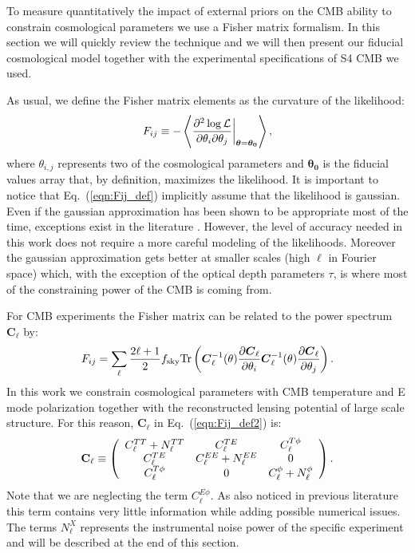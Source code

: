 \documentclass[aps,prd,reprint,superscriptaddress]{revtex4-1}
\newcommand\refeq[1]{Eq.~(\ref{eqn:#1})}
\begin{document}
To measure quantitatively the impact of external priors on the CMB ability to constrain cosmological parameters we use a Fisher matrix formalism. In this section we will quickly review  the technique and we will then present our fiducial cosmological model together with the experimental specifications of S4 CMB we used.

As usual, we define the Fisher matrix elements as the curvature of the likelihood:
\begin{equation}
	\centering
		F_{ij} \equiv - \left\langle\frac{\partial^2 \log \mathcal{L}}{\partial \theta_i \partial \theta_j} \bigg|_{\boldsymbol{\theta} = \boldsymbol{\theta_0}}\right\rangle,
	\label{eqn:Fij_def}
\end{equation}
where $\theta_{i,j}$ represents two of the cosmological parameters and $\boldsymbol{\theta_0}$ is the fiducial values array that, by definition, maximizes the likelihood. It is important to notice that \refeq{Fij_def} implicitly assume that the likelihood is gaussian. Even if the gaussian approximation has been shown to be appropriate most of the time, exceptions exist in the literature \cite{2012JCAP...09..009W}. However, the level of accuracy needed in this work does not require a more careful modeling of the likelihoods. Moreover the gaussian approximation gets better at smaller scales (high $\ell$ in Fourier space) which, with the exception of the optical depth parameters $\tau$, is where most of the constraining power of the CMB is coming from.

For CMB experiments the Fisher matrix can be related to the power spectrum $\boldsymbol{C}_\ell$ by:
\begin{equation}
 F_{ij} = \sum_\ell \frac{2\ell+1}{2} f_{\rm sky} {\rm Tr} \left(  \boldsymbol{C}^{-1}_\ell( \theta) \frac{\partial \boldsymbol{C}_\ell}{\partial \theta_i} \boldsymbol{C}^{-1}_\ell( \theta) \frac{\partial \boldsymbol{C}_\ell}{\partial \theta_j}  \right).
 \label{eqn:Fij_def2}
 \end{equation}
In this work we constrain cosmological parameters with CMB temperature and E mode polarization together with the reconstructed lensing potential of large scale structure. For this reason, $\boldsymbol{C}_\ell$ in \refeq{Fij_def2} is:
 \begin{eqnarray}
 	\centering
		\mathbf{C}_\ell \equiv \left( \begin{array}{ccc}C_\ell^{TT} + N_\ell^{TT} & C_\ell^{TE} & C_\ell^{T\phi} \\ C_\ell^{TE} & C_\ell^{EE} + N_\ell^{EE} & 0 \\ C_\ell^{T\phi} & 0 & C_\ell^{\phi} + N_\ell^{\phi}\end{array}\right).
	\label{eqn:cov_definition}
\end{eqnarray}
Note that we are neglecting the term $C_\ell^{E\phi}$. As also noticed in previous literature \cite{wu:2014,2013PhRvD..87h3008H} this term contains very little information while adding possible numerical issues.
The terms $N_\ell^{X}$ represents the instrumental noise power of the specific experiment and will be described at the end of this section.
\end{document}
